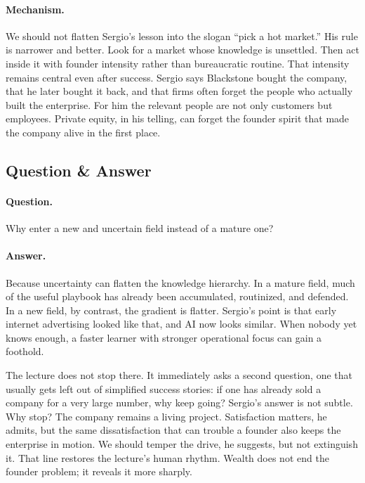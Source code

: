 \paragraph{Mechanism.}
We should not flatten Sergio's lesson into the slogan ``pick a hot market.'' His rule is narrower and better. Look for a market whose knowledge is unsettled. Then act inside it with founder intensity rather than bureaucratic routine. That intensity remains central even after success. Sergio says Blackstone bought the company, that he later bought it back, and that firms often forget the people who actually built the enterprise. For him the relevant people are not only customers but employees. Private equity, in his telling, can forget the founder spirit that made the company alive in the first place.

\subsection{Question \& Answer}

\paragraph{Question.}
Why enter a new and uncertain field instead of a mature one?

\paragraph{Answer.}
Because uncertainty can flatten the knowledge hierarchy. In a mature field, much of the useful playbook has already been accumulated, routinized, and defended. In a new field, by contrast, the gradient is flatter. Sergio's point is that early internet advertising looked like that, and AI now looks similar. When nobody yet knows enough, a faster learner with stronger operational focus can gain a foothold.

The lecture does not stop there. It immediately asks a second question, one that usually gets left out of simplified success stories: if one has already sold a company for a very large number, why keep going? Sergio's answer is not subtle. Why stop? The company remains a living project. Satisfaction matters, he admits, but the same dissatisfaction that can trouble a founder also keeps the enterprise in motion. We should temper the drive, he suggests, but not extinguish it. That line restores the lecture's human rhythm. Wealth does not end the founder problem; it reveals it more sharply.

